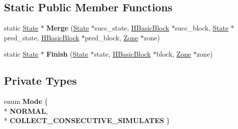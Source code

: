 \subsection*{Static Public Member Functions}
\begin{DoxyCompactItemize}
\item 
static \hyperlink{classv8_1_1internal_1_1_state}{State} $\ast$ {\bfseries Merge} (\hyperlink{classv8_1_1internal_1_1_state}{State} $\ast$succ\+\_\+state, \hyperlink{classv8_1_1internal_1_1_h_basic_block}{H\+Basic\+Block} $\ast$succ\+\_\+block, \hyperlink{classv8_1_1internal_1_1_state}{State} $\ast$pred\+\_\+state, \hyperlink{classv8_1_1internal_1_1_h_basic_block}{H\+Basic\+Block} $\ast$pred\+\_\+block, \hyperlink{classv8_1_1internal_1_1_zone}{Zone} $\ast$zone)\hypertarget{classv8_1_1internal_1_1_state_afe7a1d9946a12238558552959d5110b8}{}\label{classv8_1_1internal_1_1_state_afe7a1d9946a12238558552959d5110b8}

\item 
static \hyperlink{classv8_1_1internal_1_1_state}{State} $\ast$ {\bfseries Finish} (\hyperlink{classv8_1_1internal_1_1_state}{State} $\ast$state, \hyperlink{classv8_1_1internal_1_1_h_basic_block}{H\+Basic\+Block} $\ast$block, \hyperlink{classv8_1_1internal_1_1_zone}{Zone} $\ast$zone)\hypertarget{classv8_1_1internal_1_1_state_a460c4dcf4815d3973c42e9f8005c93d7}{}\label{classv8_1_1internal_1_1_state_a460c4dcf4815d3973c42e9f8005c93d7}

\end{DoxyCompactItemize}
\subsection*{Private Types}
\begin{DoxyCompactItemize}
\item 
enum {\bfseries Mode} \{ \\*
{\bfseries N\+O\+R\+M\+AL}, 
\\*
{\bfseries C\+O\+L\+L\+E\+C\+T\+\_\+\+C\+O\+N\+S\+E\+C\+U\+T\+I\+V\+E\+\_\+\+S\+I\+M\+U\+L\+A\+T\+ES}
 \}\hypertarget{classv8_1_1internal_1_1_state_a4a6c6bb4e3ec9a5961f3f27341e72fdc}{}\label{classv8_1_1internal_1_1_state_a4a6c6bb4e3ec9a5961f3f27341e72fdc}

\end{DoxyCompactItemize}
